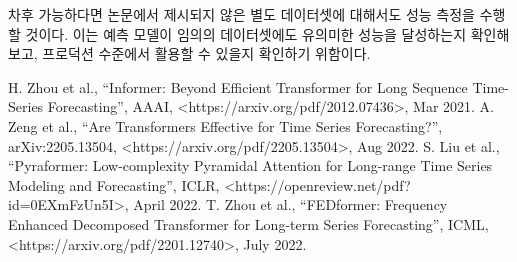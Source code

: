차후 가능하다면 논문에서 제시되지 않은 별도 데이터셋에 대해서도 성능 측정을 수행할 것이다. 이는 예측 모델이 임의의 데이터셋에도 유의미한 성능을 달성하는지 확인해보고, 프로덕션 수준에서 활용할 수 있을지 확인하기 위함이다.

\begin{thebibliography}{9}
   H. Zhou et al., ``Informer: Beyond Efficient Transformer for Long Sequence Time-Series Forecasting'', AAAI, <https://arxiv.org/pdf/2012.07436>, Mar 2021.
   A. Zeng et al., ``Are Transformers Effective for Time Series Forecasting?'', arXiv:2205.13504, <https://arxiv.org/pdf/2205.13504>, Aug 2022.
   S. Liu et al., ``Pyraformer: Low-complexity Pyramidal Attention for Long-range Time Series Modeling and Forecasting'', ICLR, <https://openreview.net/pdf?id=0EXmFzUn5I>, April 2022.
   T. Zhou et al., ``FEDformer: Frequency Enhanced Decomposed Transformer for Long-term Series Forecasting'', ICML, <https://arxiv.org/pdf/2201.12740>, July 2022.
\end{thebibliography}
